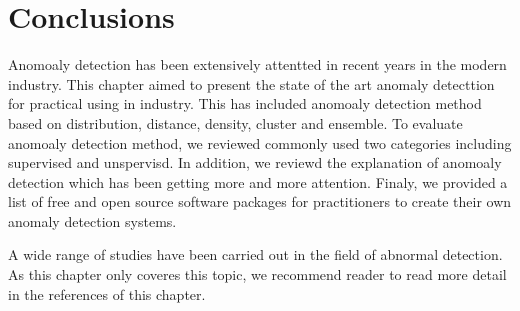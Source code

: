 \section{Conclusions} \label{sec-conclusions}

Anomoaly detection has been extensively
attentted in recent years in the modern industry.
This chapter aimed to present the state of the art
anomaly detecttion for practical using in industry.
This has included anomoaly detection method based on distribution,
distance,
density,
cluster and ensemble.
To evaluate anomoaly detection method,
we reviewed commonly used
two categories including supervised and unspervisd.
In addition,
we reviewd the explanation of anomoaly detection which
has been getting more and more attention.
Finaly,
we provided a list of free and open source software packages for
practitioners to create their own anomaly detection systems.

A wide range of studies have been carried out in the field of abnormal detection.
As this chapter only coveres this topic,
we recommend reader to read more detail in the references of this chapter.






